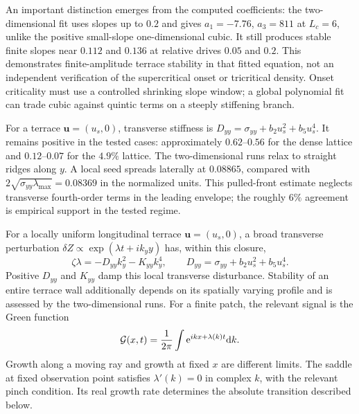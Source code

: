 An important distinction emerges from the computed coefficients: the two-dimensional fit uses slopes up to $0.2$ and gives $a_1=-7.76$, $a_3=811$ at $L_c=6$, unlike the positive small-slope one-dimensional cubic. It still produces stable finite slopes near $0.112$ and $0.136$ at relative drives $0.05$ and $0.2$. This demonstrates finite-amplitude terrace stability in that fitted equation, not an independent verification of the supercritical onset or tricritical density. Onset criticality must use a controlled shrinking slope window; a global polynomial fit can trade cubic against quintic terms on a steeply stiffening branch.

For a terrace $\bm u=(u_s,0)$, transverse stiffness is $D_{yy}=\sigma_{yy}+b_2u_s^2+b_5u_s^4$. It remains positive in the tested cases: approximately $0.62$--$0.56$ for the dense lattice and $0.12$--$0.07$ for the $4.9\%$ lattice. The two-dimensional runs relax to straight ridges along $y$. A local seed spreads laterally at $0.08865$, compared with $2\sqrt{\sigma_{yy}\lambda_{\max}}=0.08369$ in the normalized units. This pulled-front estimate neglects transverse fourth-order terms in the leading envelope; the roughly $6\%$ agreement is empirical support in the tested regime.




For a locally uniform longitudinal terrace $\bm u=(u_s,0)$, a broad transverse perturbation $\delta Z\propto\exp(\lambda t+ik_yy)$ has, within this closure,
\begin{equation}
\zeta\lambda=-D_{yy}k_y^2-K_{yy}k_y^4,
\qquad D_{yy}=\sigma_{yy}+b_2u_s^2+b_5u_s^4.
\label{eq:transverse-dispersion}
\end{equation}
Positive $D_{yy}$ and $K_{yy}$ damp this local transverse disturbance. Stability of an entire terrace wall additionally depends on its spatially varying profile and is assessed by the two-dimensional runs. For a finite patch, the relevant signal is the Green function
\begin{equation}
\mathcal G(x,t)=\frac1{2\pi}\int\mathrm{e}^{ikx+\lambda(k)t}\mathrm{d} k.
\label{eq:patch-green}
\end{equation}
Growth along a moving ray and growth at fixed $x$ are different limits. The saddle at fixed observation point satisfies $\lambda'(k)=0$ in complex $k$, with the relevant pinch condition. Its real growth rate determines the absolute transition described below.

